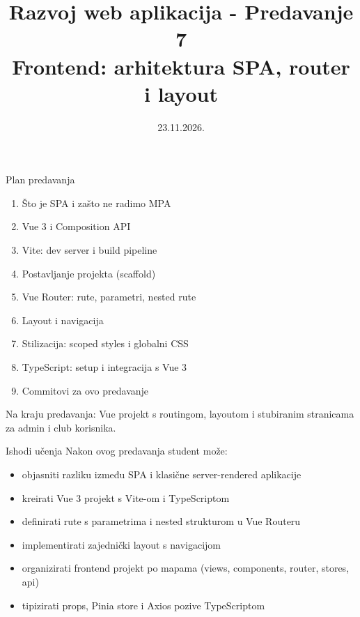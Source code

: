 

\title[Razvoj web aplikacija]{Razvoj web aplikacija - Predavanje 7 \\ Frontend: arhitektura SPA, router i layout}
\date{23.11.2026.}



\frame{\titlepage}

\begin{frame}{Plan predavanja}
\begin{enumerate}
  \item Što je SPA i zašto ne radimo MPA
  \item Vue 3 i Composition API
  \item Vite: dev server i build pipeline
  \item Postavljanje projekta (scaffold)
  \item Vue Router: rute, parametri, nested rute
  \item Layout i navigacija
  \item Stilizacija: scoped styles i globalni CSS
  \item TypeScript: setup i integracija s Vue 3
  \item Commitovi za ovo predavanje
\end{enumerate}

\vspace{0.6em}
Na kraju predavanja: Vue projekt s routingom, layoutom i stubiranim stranicama za admin i club korisnika.
\end{frame}

\begin{frame}{Ishodi učenja}
Nakon ovog predavanja student može:
\begin{itemize}
  \item objasniti razliku između SPA i klasične server-rendered aplikacije
  \item kreirati Vue 3 projekt s Vite-om i TypeScriptom
  \item definirati rute s parametrima i nested strukturom u Vue Routeru
  \item implementirati zajednički layout s navigacijom
  \item organizirati frontend projekt po mapama (views, components, router, stores, api)
  \item tipizirati props, Pinia store i Axios pozive TypeScriptom
\end{itemize}
\end{frame}

